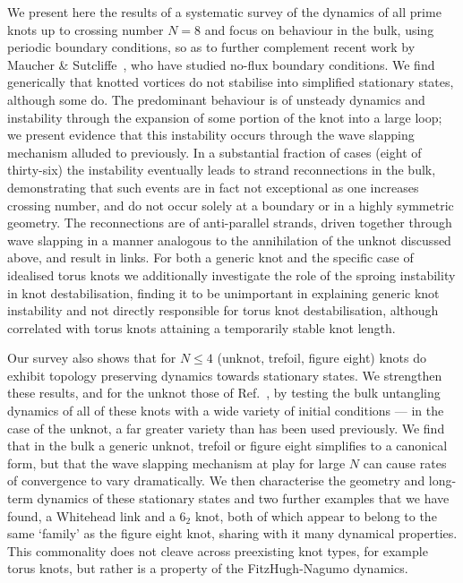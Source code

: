 We present here the results of a systematic survey of the dynamics of all prime knots up to crossing number $N=8$ and focus on behaviour in the bulk, using periodic boundary conditions, so as to further complement recent work by Maucher \& Sutcliffe~\citep{Maucher2016,Maucher2017,Maucher2018,Maucher2019}, who have studied no-flux boundary conditions. We find generically that knotted vortices do not stabilise into simplified stationary states, although some do. The predominant behaviour is of unsteady dynamics and instability through the expansion of some portion of the knot into a large loop; we present evidence that this instability occurs through the wave slapping mechanism alluded to previously. In a substantial fraction of cases (eight of thirty-six) the instability eventually leads to strand reconnections in the bulk, demonstrating that such events are in fact not exceptional as one increases crossing number, and do not occur solely at a boundary or in a highly symmetric geometry. The reconnections are of anti-parallel strands, driven together through wave slapping in a manner analogous to the annihilation of the unknot discussed above, and result in links. For both a generic knot and the specific case of idealised torus knots we additionally investigate the role of the sproing instability in knot destabilisation, finding it to be unimportant in explaining generic knot instability and not directly responsible for torus knot destabilisation, although correlated with torus knots attaining a temporarily stable knot length.

Our survey also shows that for $N\leq4$ (unknot, trefoil, figure eight) knots do exhibit topology preserving dynamics towards stationary states. We strengthen these results, and for the unknot those of Ref.~\citep{Maucher2016}, by testing the bulk untangling dynamics of all of these knots with a wide variety of initial conditions --- in the case of the unknot, a far greater variety than has been used previously. We find that in the bulk a generic unknot, trefoil or figure eight simplifies to a canonical form, but that the wave slapping mechanism at play for large $N$ can cause rates of convergence to vary dramatically. We then characterise the geometry and long-term dynamics of these stationary states and two further examples that we have found, a Whitehead link and a $6_2$ knot, both of which appear to belong to the same `family' as the figure eight knot, sharing with it many dynamical properties. This commonality does not cleave across preexisting knot types, for example torus knots, but rather is a property of the FitzHugh-Nagumo dynamics.

